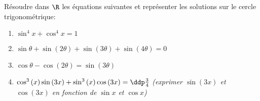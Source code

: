 
\begin{exercice}  \;
R\'esoudre dans $\R$ les \'equations suivantes et repr\'esenter les solutions sur le cercle trigonom\'etrique:
\begin{enumerate}
\item
$\sin^4{x}+\cos^4{x}=1$
\item
$\sin{\theta}+\sin{(2\theta)}+\sin{(3\theta)}+\sin{(4\theta)}=0$
\item
$\cos{\theta}-\cos{(2\theta)}=\sin{(3\theta)}$
\item
$\cos^3{(x)}\sin{(3x)} + \sin^3{(x)}\cos{(3x)}=\ddp\frac{3}{4}$ \; \textit{(exprimer $\sin{(3x)}$ et $\cos{(3x)}$ 
en fonction de $\sin{x}$ et $\cos{x}$)}
\end{enumerate}
\end{exercice}